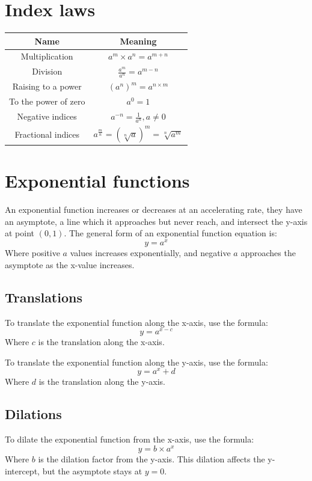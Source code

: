 \documentclass{book}
\begin{document}
\chapter{Index laws}
\begin{center}
	\begin{tabular}{c|c}
		Name                 & Meaning                                             \\ \hline
		Multiplication       & $a^m \times a^n = a^{m + n}$                        \\
		Division             & $\frac{a^m}{a^n} = a^{m - n}$                       \\
		Raising to a power   & $(a^n)^m = a^{n \times m}$                          \\
		To the power of zero & $a^0 = 1$                                           \\
		Negative indices     & $a^{-n} = \frac{1}{a^n}, a \not = 0$                \\
		Fractional indices   & $a^{\frac{m}{n}} = (\sqrt[n]{a})^m = \sqrt[n]{a^m}$
	\end{tabular}
\end{center}

\chapter{Exponential functions}
An exponential function increases or decreases at an accelerating rate, they have an asymptote, a line which it approaches but never reach, and intersect the y-axis at point $(0, 1)$.  The general form of an exponential function equation is:
\[
	y = a^x
\]
Where positive $a$ values increases exponentially, and negative $a$ approaches the asymptote as the x-value increases.

\section{Translations}
To translate the exponential function along the x-axis, use the formula:
\[
	y = a^{x - c}
\]
Where $c$ is the translation along the x-axis.

To translate the exponential function along the y-axis, use the formula:
\[
	y = a^x + d
\]
Where $d$ is the translation along the y-axis.

\section{Dilations}
To dilate the exponential function from the x-axis, use the formula:
\[
	y = b \times a^x
\]
Where $b$ is the dilation factor from the y-axis.  This dilation affects the y-intercept, but the asymptote stays at $y = 0$.
\end{document}
